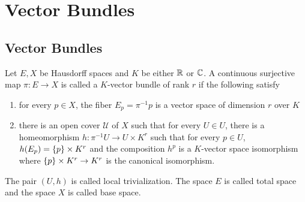 \chapter{Vector Bundles}

\section{Vector Bundles}

\begin{definition}
	Let $E, X$ be Hausdorff spaces and $K$ be either $\mathbb{R}$ or $\mathbb{C}$. A continuous surjective map $\pi: E \to X$ is called a $K$-vector bundle of rank $r$ if the following satisfy
	\begin{enumerate}
		\item for every $p \in X$, the fiber $E_p = \pi^{-1} p$ is a vector space of dimension $r$ over $K$
		
		\item there is an open cover $\mathcal{U}$ of $X$ such that for every $U \in U$, there is a homeomorphism $h: \pi^{-1} U \to U \times K^r$ such that for every $p \in U$, $h(E_p) = \{p\} \times K^r$ and the composition $h^p$ is a $K$-vector space isomorphism where $\{p\} \times K^r \to K^r$ is the canonical isomorphism.
		\begin{center}
		\end{center}
		
	\end{enumerate}
	
	The pair $(U, h)$ is called local trivialization. The space $E$ is called total space and the space $X$ is called base space. 
\end{definition}

